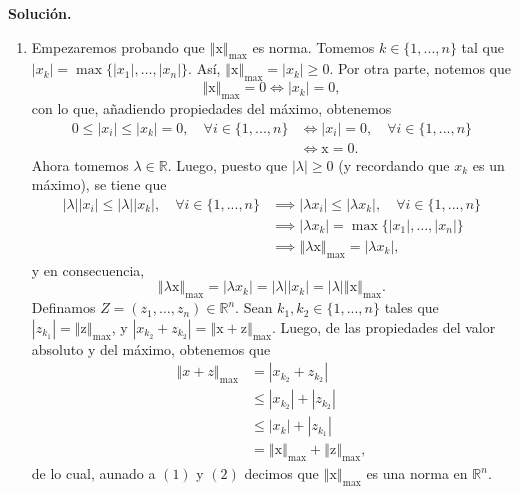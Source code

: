 \documentclass[12pt]{article}
\newcommand{\abs}[1]{\left\vert#1\right\vert}
\newcommand{\norm}[1]{\left\Vert#1\right\Vert}
\newcommand{\R}{\mathbb R}
\newcommand{\x}{\mathrm x}
\newcommand{\z}{\mathrm z}
\begin{document}
\begin{enumerate}
\textbf{Solución.}
\begin{enumerate}[(1)]
    \item Empezaremos probando que $\norm{\x}_{\max}$ es norma. Tomemos $k \in \{1,...,n\}$ tal que \\
    $\abs{x_k}=\max\{\abs{x_1},\ldots,\abs{x_n}\}$. Así, $\norm{\x}_{\max}=\abs{x_k} \geq 0$. Por otra parte, notemos que
    \begin{equation*}
        \norm{\x}_{\max}=0 \iff \abs{x_k}=0,
    \end{equation*}
    con lo que, añadiendo propiedades del máximo, obtenemos
    \begin{align*}
            0 \leq \abs{x_i} \leq \abs{x_k} = 0, \quad \forall i\in \{1,...,n\} &\iff \abs{x_i}=0, \quad \forall i \in \{1,...,n\} \\
            &\iff \x = 0. \tag{1}
    \end{align*}
    Ahora tomemos $\lambda \in \R$. Luego, puesto que $\abs{\lambda} \geq 0$ (y recordando que $x_k$ es un máximo), se tiene que
    \begin{align*}
        \abs{\lambda}\abs{x_i} \leq \abs{\lambda}\abs{x_k}, \quad \forall i\in \{1,...,n\} &\implies \abs{\lambda x_i} \leq \abs{\lambda x_k}, \quad \forall i\in \{1,...,n\} \\
        &\implies \abs{\lambda x_k}=\max\{\abs{x_1},\ldots,\abs{x_n}\} \\
        &\implies \norm{\lambda \x}_{\max}=\abs{\lambda x_k},
    \end{align*}
    y en consecuencia,
    \[
    \norm{\lambda \x}_{\max}=\abs{\lambda x_k}=\abs{\lambda}\abs{x_k}=\abs{\lambda}\norm{\x}_{\max}. \tag{2}
    \]
    Definamos $Z=(z_1,\ldots,z_n) \in \R^n$. Sean $k_1,k_2\in \{1,...,n\}$ tales que $\abs{z_{k_1}}=\norm{\z}_{\max}$, y $\abs{x_{k_2}+z_{k_2}}=\norm{\x+\z}_{\max}$. Luego, de las propiedades del
    valor absoluto y del máximo, obtenemos que
    \begin{align*}
        \norm{x+z}_{\max} &= \abs{x_{k_2}+z_{k_2}} \\
        &\leq \abs{x_{k_2}} + \abs{z_{k_2}} \\
        &\leq \abs{x_k} + \abs{z_{k_1}} \\
        &= \norm{\x}_{\max} + \norm{\z}_{\max},
    \end{align*}
    de lo cual,  aunado a $(1)$ y $(2)$ decimos que $\norm{\x}_{\max}$ es una norma en $\R^n$.
    

\end{enumerate}
\end{enumerate}
\end{document}
